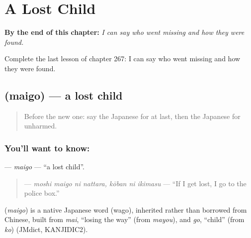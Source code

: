 
\chapter{A Lost Child}
\label{ch:ja-a-lost-child}

\begin{chapteropening}
\textbf{By the end of this chapter:} \emph{I can say who went missing and how they were found.}

Complete the last lesson of chapter 267: I can say who went missing and how they were found.
\end{chapteropening}

\section[\texorpdfstring{\ja{まいご} (maigo)}{まいご (maigo)}]{ (maigo) — a lost child}

\label{lesson:JA-C267-maigo}



\begin{quote}
Before the new one: say the Japanese for at last, then the Japanese for unharmed.
\end{quote}

\subsection*{You'll want to know: }
\textbf{} — \emph{maigo} — \textquotedblleft{}a lost child\textquotedblright{}.

\begin{quote}
\textbf{   } — \emph{moshi maigo ni nattara, kōban ni ikimasu} — \textquotedblleft{}If I get lost, I go to the police box.\textquotedblright{}
\end{quote}

\begin{cousinweb}
\textbf{} (\emph{maigo}) is a native Japanese word (wago), inherited rather than borrowed from Chinese, built from \emph{mai}, \textquotedblleft{}losing the way\textquotedblright{} (from \emph{mayou}), and \emph{go}, \textquotedblleft{}child\textquotedblright{} (from \emph{ko}) (JMdict, KANJIDIC2).
\end{cousinweb}

